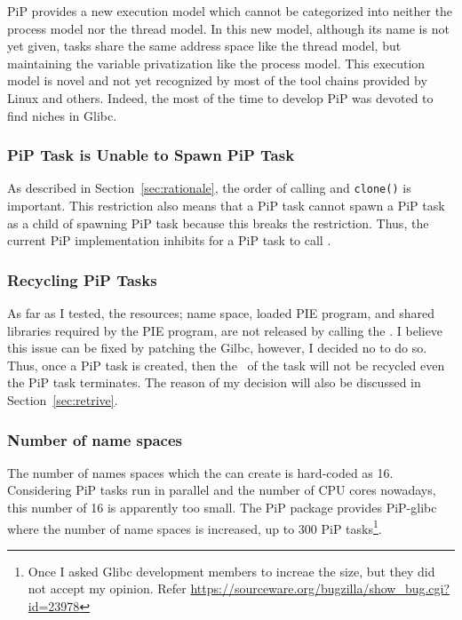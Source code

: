 PiP provides a new execution model which cannot be categorized into
neither the process model nor the thread model. In this new model,
although its name is not yet given, tasks share the same address
space like the thread model, but maintaining the variable
privatization like the process model. This execution
model is novel and not yet recognized by most of the tool chains
provided by Linux and others. Indeed, the most of the time to develop
PiP was devoted to find niches in Glibc.

\subsubsection{PiP Task is Unable to Spawn PiP Task}

As described in Section~\ref{sec:rationale}, the order of calling
 and {\tt clone()} is important. This restriction
also means that a PiP task cannot spawn a PiP task as a child of
spawning PiP task because this breaks the restriction. Thus, the
current PiP implementation inhibits for a PiP task to call
. 

\subsubsection{Recycling PiP Tasks}\label{sec:recycle}

As far as I tested, the resources; name space, loaded PIE program, and shared
libraries required by the PIE program, are not released by calling the
. I believe this issue can be fixed by patching the
Gilbc, however, I decided no to do so. Thus, once a PiP task is
created, then the \PIPID\ of the task will not be recycled even the PiP
task terminates. The reason of my decision will also be
discussed in Section~\ref{sec:retrive}.

\subsubsection{Number of name spaces}\label{sec:name-space}

The number of names spaces which the  can create is
hard-coded as 16. Considering PiP tasks run in parallel and the number
of CPU cores nowadays, this number of 16 is apparently too small. The
PiP package provides PiP-glibc where the number of name spaces is
increased, up to 300 PiP tasks\footnote{Once I asked Glibc
development members to increae the size, but they did not accept my
opinion. Refer
\url{https://sourceware.org/bugzilla/show_bug.cgi?id=23978}}.  

